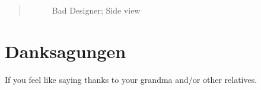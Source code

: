 \begin{otherlanguage}{english}
\begin{abstract}
\begin{flushright}
\begin{figure}
\begin{center}
		\end{center}
		\caption{Bad Designer; Side view}
		\end{figure}
\end{flushright}

\end{abstract}
\end{otherlanguage}

\newpage
\clearpage
\section*{Danksagungen}
If you feel like saying thanks to your grandma and/or other relatives.
